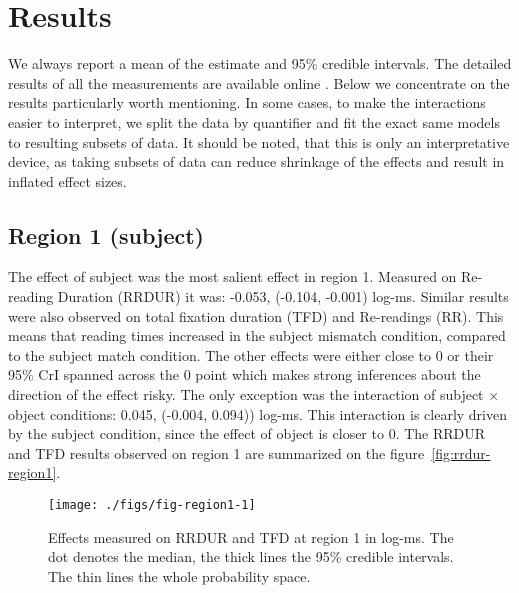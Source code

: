 \section{Results}

We always report a mean of the estimate and 95\% credible intervals.
The detailed results of all the measurements are available online \cite{osf-repo}. Below we concentrate on the results particularly worth mentioning.
In some cases, to make the interactions easier to interpret, we split the data by quantifier and fit the exact same models to resulting subsets of data. It should be noted, that this is only an interpretative device, as taking subsets of data can reduce shrinkage of the effects and result in inflated effect sizes.



\subsection{Region 1 (subject)}

The effect of subject was the most salient effect in region 1.
Measured on Re-reading Duration (RRDUR) it was: -0.053, (-0.104, -0.001) log-ms. Similar results were also observed on
total fixation duration (TFD) and
Re-readings (RR). This means that reading times increased in the subject
mismatch condition, compared to the subject match condition. The other effects
were either close to 0 or their 95\% CrI spanned across the 0 point which makes
strong inferences about the direction of the effect risky. The only exception
was the interaction of subject $\times$ object conditions: 0.045, (-0.004, 0.094)) log-ms. This interaction is clearly driven by the subject condition, since the
effect of object is closer to 0. The RRDUR and TFD results observed on region 1 are
summarized on the figure~\ref{fig:rrdur-region1}.

\begin{knitrout}
\color{fgcolor}\begin{figure}
\texttt{[image: ./figs/fig-region1-1]} \caption{\label{fig:rrdur-region1}Effects measured on RRDUR and TFD at region 1 in log-ms. The dot denotes the median, the thick lines the 95\% credible intervals. The thin lines the whole probability space.}\label{fig:fig-region1}
\end{figure}


\end{knitrout}



